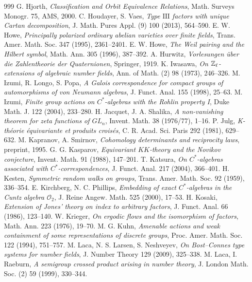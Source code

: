 \begin{thebibliography}{999}
 G. Hjorth, \emph{Classification and Orbit Equivalence Relations}, Math. Surveys Monogr. 75, AMS, 2000.
 C. Houdayer, S. Vaes, \emph{Type $\mathrm{III}$ factors with unique Cartan decomposition}, J. Math. Pures Appl. (9) 100 (2013), 564--590.
 E. W. Howe, \emph{Principally polarized ordinary abelian varieties over finite fields}, Trans. Amer. Math. Soc. 347 (1995), 2361--2401.
 E. W. Howe, \emph{The Weil pairing and the Hilbert symbol}, Math. Ann. 305 (1996), 387--392.
 A. Hurwitz, \emph{Vorlesungen \"uber die Zahlentheorie der Quaternionen}, Springer, 1919.
 K. Iwasawa, \emph{On $\mathbb{Z}_\ell$-extensions of algebraic number fields}, Ann. of Math. (2) 98 (1973), 246--326.
 M. Izumi, R. Longo, S. Popa, \emph{A Galois correspondence for compact groups of automorphisms of von Neumann algebras}, J. Funct. Anal. 155 (1998), 25--63.
 M. Izumi, \emph{Finite group actions on $C^*$-algebras with the Rohlin property I}, Duke Math. J. 122 (2004), 233--280.
 H. Jacquet, J. A. Shalika, \emph{A non-vanishing theorem for zeta functions of $GL_n$}, Invent. Math. 38 (1976/77), 1--16.
 P. Julg, \emph{K-th\'eorie \'equivariante et produits crois\'es}, C. R. Acad. Sci. Paris 292 (1981), 629--632.
 M. Kapranov, A. Smirnov, \emph{Cohomology determinants and reciprocity laws}, preprint, 1995.
 G. G. Kasparov, \emph{Equivariant $KK$-theory and the Novikov conjecture}, Invent. Math. 91 (1988), 147--201.
 T. Katsura, \emph{On $C^*$-algebras associated with $C^*$-correspondences}, J. Funct. Anal. 217 (2004), 366--401.
 H. Kesten, \emph{Symmetric random walks on groups}, Trans. Amer. Math. Soc. 92 (1959), 336--354.
 E. Kirchberg, N. C. Phillips, \emph{Embedding of exact $C^*$-algebras in the Cuntz algebra $\mathcal O_2$}, J. Reine Angew. Math. 525 (2000), 17--53.
 H. Kosaki, \emph{Extension of Jones' theory on index to arbitrary factors}, J. Funct. Anal. 66 (1986), 123--140.
 W. Krieger, \emph{On ergodic flows and the isomorphism of factors}, Math. Ann. 223 (1976), 19--70.
 M. G. Kuhn, \emph{Amenable actions and weak containment of some representations of discrete groups}, Proc. Amer. Math. Soc. 122 (1994), 751--757.
 M. Laca, N. S. Larsen, S. Neshveyev, \emph{On Bost--Connes type systems for number fields}, J. Number Theory 129 (2009), 325--338.
 M. Laca, I. Raeburn, \emph{A semigroup crossed product arising in number theory}, J. London Math. Soc. (2) 59 (1999), 330--344.

\end{thebibliography}
